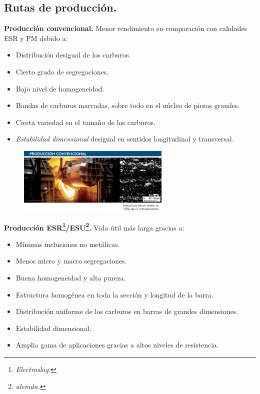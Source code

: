 \documentclass[12pt,a4paper]{article}
\begin{document}
\subsection{Rutas de producción.}
\textbf{Producción convencional.} Menor rendimiento en comparación con calidades ESR y PM debido a:
\begin{itemize}
    \item Distribución desigual de los carburos.
    \item Cierto grado de segregaciones.
    \item Bajo nivel de homogeneidad.
    \item Bandas de carburos marcadas, sobre todo en el núcleo de piezas grandes.
    \item Cierta variedad en el tamaño de los carburos.
    \item \textit{Estabilidad dimensional} desigual en sentidos longitudinal y transversal.
\end{itemize}
\begin{figure}[H]    
    \centering         
    \includegraphics[width=0.65\textwidth]{Inagenes para latex/7.png}
\end{figure}
\textbf{Producción ESR\footnote{\textit{Electroslag.}}/ESU\footnote{\textit{alemán.}}.} Vida útil más larga gracias a:
\begin{itemize}
    \item Mínimas inclusiones no metálicas.
    \item Menos micro y macro segregaciones.
    \item Buena homogeneidad y alta pureza.
    \item Estructura homogénea en toda la sección y longitud de la barra.
    \item Distribución uniforme de los carburos en barras de grandes dimensiones.
    \item Estabilidad dimensional.
    \item Amplia gama de aplicaciones gracias a altos niveles de resistencia.
\end{itemize}
\end{document}
